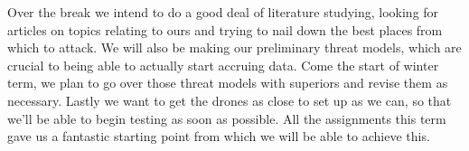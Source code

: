 \documentclass[IEEEtran,letterpaper,10pt,notitlepage,draftclsnofoot,onecolumn]{article}
\begin{document}
Over the break we intend to do a good deal of literature studying, looking for articles on topics relating to ours and trying to nail down the best places from which to attack.
We will also be making our preliminary threat models, which are crucial to being able to actually start accruing data.
Come the start of winter term, we plan to go over those threat models with superiors and revise them as necessary.
Lastly we want to get the drones as close to set up as we can, so that we'll be able to begin testing as soon as possible.
All the assignments this term gave us a fantastic starting point from which we will be able to achieve this.




\end{document}

